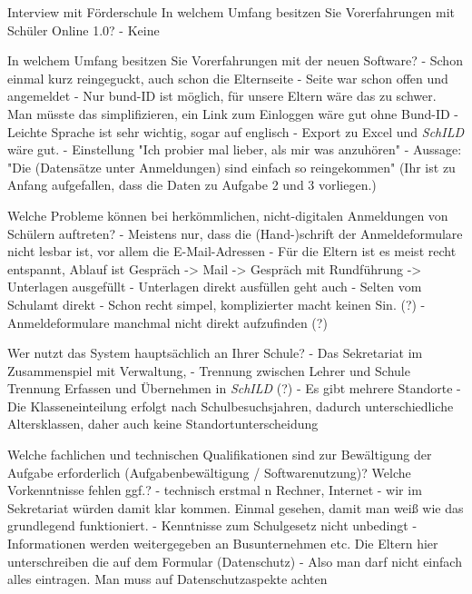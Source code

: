 Interview mit Förderschule
In welchem Umfang besitzen Sie Vorerfahrungen mit Schüler Online 1.0? 		
- Keine

In welchem Umfang besitzen Sie Vorerfahrungen mit der neuen Software?		
- Schon einmal kurz reingeguckt, auch schon die Elternseite
- Seite war schon offen und angemeldet	
- Nur bund-ID ist möglich, für unsere Eltern wäre das zu schwer. Man müsste das simplifizieren, ein Link zum Einloggen wäre gut ohne Bund-ID
- Leichte Sprache ist sehr wichtig, sogar auf englisch
- Export zu Excel und \textit{SchILD} wäre gut.
- Einstellung "Ich probier mal lieber, als mir was anzuhören"
- Aussage: "Die (Datensätze unter Anmeldungen) sind einfach so reingekommen" (Ihr ist zu Anfang aufgefallen, dass die Daten zu Aufgabe 2 und 3 vorliegen.)



Welche Probleme können bei herkömmlichen, nicht-digitalen Anmeldungen von Schülern auftreten?
- Meistens nur, dass die (Hand-)schrift der Anmeldeformulare nicht lesbar ist, vor allem die E-Mail-Adressen
- Für die Eltern ist es meist recht entspannt, Ablauf ist Gespräch -> Mail -> Gespräch mit Rundführung -> Unterlagen ausgefüllt
- Unterlagen direkt ausfüllen geht auch
- Selten vom Schulamt direkt
- Schon recht simpel, komplizierter macht keinen Sin. (?)
- Anmeldeformulare manchmal nicht direkt aufzufinden (?)



Wer nutzt das System hauptsächlich an Ihrer Schule?
- Das Sekretariat im Zusammenspiel mit Verwaltung, 
- Trennung zwischen Lehrer und Schule Trennung Erfassen und Übernehmen in \textit{SchILD} (?)
- Es gibt mehrere Standorte	
- Die Klasseneinteilung erfolgt nach Schulbesuchsjahren, dadurch unterschiedliche Altersklassen, daher auch keine Standortunterscheidung




Welche fachlichen und technischen Qualifikationen sind zur Bewältigung der Aufgabe erforderlich (Aufgabenbewältigung / Softwarenutzung)? Welche Vorkenntnisse fehlen ggf.?
- technisch erstmal n Rechner, Internet
- wir im Sekretariat würden damit klar kommen. Einmal gesehen, damit man weiß wie das grundlegend funktioniert.
- Kenntnisse zum Schulgesetz nicht unbedingt
- Informationen werden weitergegeben an Busunternehmen etc. Die Eltern hier unterschreiben die auf dem Formular (Datenschutz)
- Also man darf nicht einfach alles eintragen. Man muss auf Datenschutzaspekte achten






